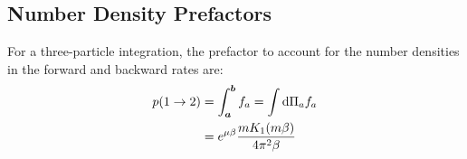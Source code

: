 \documentclass[
  a4paper,             %
  11pt,                %
  oneside,             %
  onecolumn,           %
  bibliography=totoc,  %
  final,               %
]{scrartcl}
\begin{document}
\subsection{Number Density Prefactors}%
\label{sec:number_density_prefactors}

For a three-particle integration, the prefactor to account for the number
densities in the forward and backward rates are:
\begin{equation}
  \begin{aligned}
    p(1 \to 2)
    &= \int_{\boldsymbol{a}}^{\boldsymbol{b}} f_a = \int \mathop{}\!\mathrm{d} \Pi_a f_a \\
    &= e^{\mu \beta} \frac{m K_1(m \beta)}{4 \pi^2 \beta}
  \end{aligned}
\end{equation}

\printglossaries%
\end{document}
